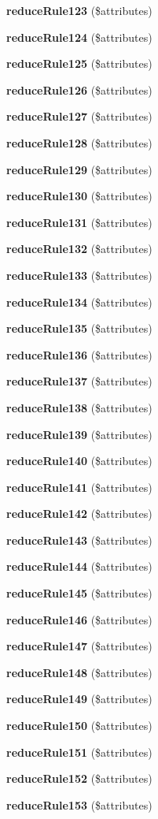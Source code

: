 \begin{DoxyCompactItemize}
\item 
{\bf reduce\+Rule123} (\$attributes)
\item 
{\bf reduce\+Rule124} (\$attributes)
\item 
{\bf reduce\+Rule125} (\$attributes)
\item 
{\bf reduce\+Rule126} (\$attributes)
\item 
{\bf reduce\+Rule127} (\$attributes)
\item 
{\bf reduce\+Rule128} (\$attributes)
\item 
{\bf reduce\+Rule129} (\$attributes)
\item 
{\bf reduce\+Rule130} (\$attributes)
\item 
{\bf reduce\+Rule131} (\$attributes)
\item 
{\bf reduce\+Rule132} (\$attributes)
\item 
{\bf reduce\+Rule133} (\$attributes)
\item 
{\bf reduce\+Rule134} (\$attributes)
\item 
{\bf reduce\+Rule135} (\$attributes)
\item 
{\bf reduce\+Rule136} (\$attributes)
\item 
{\bf reduce\+Rule137} (\$attributes)
\item 
{\bf reduce\+Rule138} (\$attributes)
\item 
{\bf reduce\+Rule139} (\$attributes)
\item 
{\bf reduce\+Rule140} (\$attributes)
\item 
{\bf reduce\+Rule141} (\$attributes)
\item 
{\bf reduce\+Rule142} (\$attributes)
\item 
{\bf reduce\+Rule143} (\$attributes)
\item 
{\bf reduce\+Rule144} (\$attributes)
\item 
{\bf reduce\+Rule145} (\$attributes)
\item 
{\bf reduce\+Rule146} (\$attributes)
\item 
{\bf reduce\+Rule147} (\$attributes)
\item 
{\bf reduce\+Rule148} (\$attributes)
\item 
{\bf reduce\+Rule149} (\$attributes)
\item 
{\bf reduce\+Rule150} (\$attributes)
\item 
{\bf reduce\+Rule151} (\$attributes)
\item 
{\bf reduce\+Rule152} (\$attributes)
\item 
{\bf reduce\+Rule153} (\$attributes)

\end{DoxyCompactItemize}
